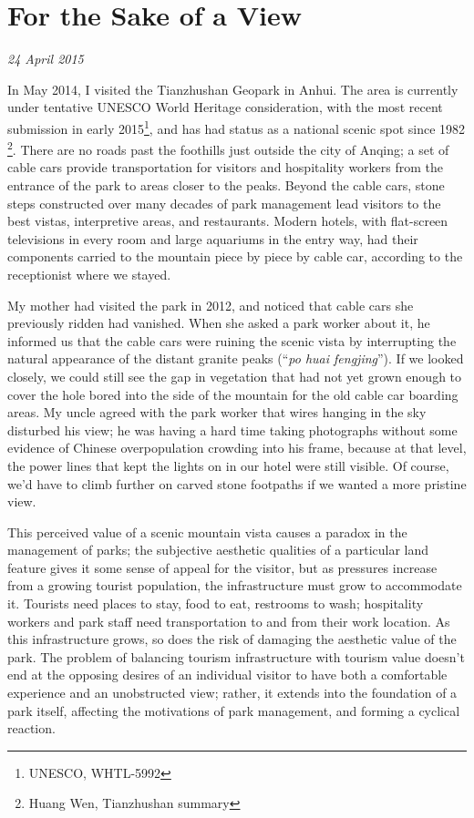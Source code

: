 \section{For the Sake of a View}

\textit{24 April 2015}

In May 2014, I visited the Tianzhushan Geopark in Anhui. The area is currently
under tentative UNESCO World Heritage consideration, with the most recent
submission in early 2015\footnote{UNESCO, WHTL-5992}, and has had status as a
national scenic spot since 1982 \footnote{Huang Wen, Tianzhushan summary}.
There are no roads past the foothills just outside the city of Anqing; a set of
cable cars provide transportation for visitors and hospitality workers from the
entrance of the park to areas closer to the peaks. Beyond the cable cars, stone
steps constructed over many decades of park management lead visitors to the best
vistas, interpretive areas, and restaurants. Modern hotels, with flat-screen
televisions in every room and large aquariums in the entry way, had their
components carried to the mountain piece by piece by cable car, according to the
receptionist where we stayed.

My mother had visited the park in 2012, and noticed that cable cars she
previously ridden had vanished. When she asked a park worker about it, he
informed us that the cable cars were ruining the scenic vista by interrupting
the natural appearance of the distant granite peaks (``\textit{po huai
fengjing}''). If we looked closely, we could still see the gap in vegetation
that had not yet grown enough to cover the hole bored into the side of the
mountain for the old cable car boarding areas. My uncle agreed with the park
worker that wires hanging in the sky disturbed his view; he was having a hard
time taking photographs without some evidence of Chinese overpopulation crowding
into his frame, because at that level, the power lines that kept the lights on
in our hotel were still visible. Of course, we'd have to climb further on carved
stone footpaths if we wanted a more pristine view.

This perceived value of a scenic mountain vista causes a paradox in the
management of parks; the subjective aesthetic qualities of a particular land
feature gives it some sense of appeal for the visitor, but as pressures increase
from a growing tourist population, the infrastructure must grow to accommodate
it. Tourists need places to stay, food to eat, restrooms to wash; hospitality
workers and park staff need transportation to and from their work location. As
this infrastructure grows, so does the risk of damaging the aesthetic value of
the park. The problem of balancing tourism infrastructure with tourism value
doesn't end at the opposing desires of an individual visitor to have both a
comfortable experience and an unobstructed view; rather, it extends into the
foundation of a park itself, affecting the motivations of park management, and
forming a cyclical reaction.

